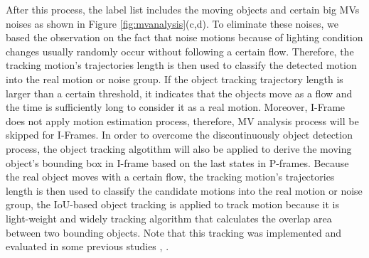 After this process, the label list includes the moving objects and certain big MVs noises as shown in Figure \ref{fig:mvanalysis}(c,d). To eliminate these noises, we based the observation on the fact that noise motions because of lighting condition changes usually randomly occur without following a certain flow. Therefore, the tracking motion’s trajectories length is then used to classify the detected motion into the real motion or noise group. If the object tracking trajectory length is larger than a certain threshold, it indicates that the objects move as a flow and the time is sufficiently long to consider it as a real motion. Moreover, I-Frame does not apply motion estimation process, therefore, MV analysis process will be skipped for I-Frames. In order to overcome the discontinuously object detection process, the object tracking algotithm will also be applied to derive the moving object's bounding box in I-frame based on the last states in P-frames. Because the real object moves with a certain flow, the tracking
motion’s trajectories length is then used to classify the candidate
motions into the real motion or noise group, the IoU-based object tracking is applied to track motion because it is light-weight and widely tracking algorithm that calculates the overlap area between two bounding objects. Note that this tracking was implemented and evaluated in some previous studies  \cite{sheu2019stam}, \cite{li2020hksiamfc}. 
